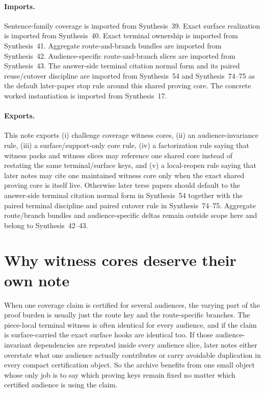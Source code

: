 \documentclass[11pt]{article}
\begin{document}
\paragraph{Imports.}
Sentence-family coverage is imported from Synthesis~39.\cite{series:challengecoverage}
Exact surface realization is imported from Synthesis~40.\cite{series:challengesurfacehooks}
Exact terminal ownership is imported from Synthesis~41.\cite{series:challengeterminalwitnesses}
Aggregate route-and-branch bundles are imported from Synthesis~42.\cite{series:challengecoveragewitnesspacks}
Audience-specific route-and-branch slices are imported from Synthesis~43.\cite{series:challengecoveragewitnessslices}
The answer-side terminal citation normal form and its paired reuse/cutover discipline are imported from Synthesis~54 and Synthesis~74--75 as the default later-paper stop rule around this shared proving core.\cite{series:challengeanswerreviewmenus,series:pairedterminalcitationdiscipline,series:pairedterminalcutoverrules}
The concrete worked instantiation is imported from Synthesis~17.\cite{series:workedexample}
\paragraph{Exports.}
This note exports (i) challenge coverage witness cores, (ii) an audience-invariance rule, (iii) a surface/support-only core rule, (iv) a factorization rule saying that witness packs and witness slices may reference one shared core instead of restating the same terminal/surface keys, and (v) a local-reopen rule saying that later notes may cite one maintained witness core only when the exact shared proving core is itself live.
Otherwise later terse papers should default to the answer-side terminal citation normal form in Synthesis~54 together with the paired terminal discipline and paired cutover rule in Synthesis~74--75. Aggregate route/branch bundles and audience-specific deltas remain outside scope here and belong to Synthesis~42--43.\cite{series:challengecoveragewitnesspacks,series:challengecoveragewitnessslices,series:challengeanswerreviewmenus,series:pairedterminalcitationdiscipline,series:pairedterminalcutoverrules}
\section{Why witness cores deserve their own note}
When one coverage claim is certified for several audiences, the varying part of the proof burden is usually just the route key and the route-specific branches.
The piece-local terminal witness is often identical for every audience, and if the claim is surface-carried the exact surface hooks are identical too.
If those audience-invariant dependencies are repeated inside every audience slice, later notes either overstate what one audience actually contributes or carry avoidable duplication in every compact certification object.
So the archive benefits from one small object whose only job is to say which proving keys remain fixed no matter which certified audience is using the claim.
\end{document}
